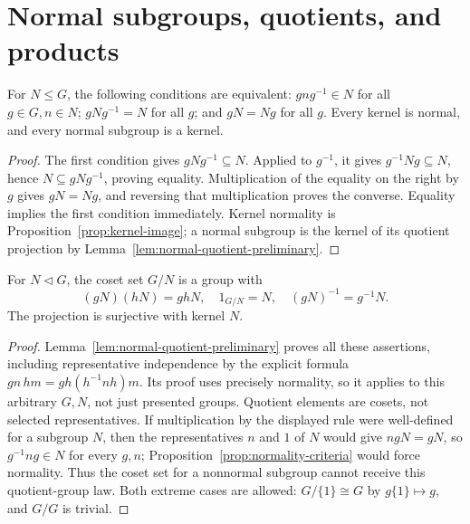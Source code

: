 \chapter{Normal subgroups, quotients, and products}\label{chap:M07.04}

\begin{proposition}\label{prop:normality-criteria}
For $N\leq G$, the following conditions are equivalent: $gng^{-1}\in N$ for all $g\in G,n\in N$; $gNg^{-1}=N$ for all $g$; and $gN=Ng$ for all $g$. Every kernel is normal, and every normal subgroup is a kernel.
\end{proposition}
\begin{proof}
The first condition gives $gNg^{-1}\subseteq N$. Applied to $g^{-1}$, it gives $g^{-1}Ng\subseteq N$, hence $N\subseteq gNg^{-1}$, proving equality. Multiplication of the equality on the right by $g$ gives $gN=Ng$, and reversing that multiplication proves the converse. Equality implies the first condition immediately. Kernel normality is Proposition~\ref{prop:kernel-image}; a normal subgroup is the kernel of its quotient projection by Lemma~\ref{lem:normal-quotient-preliminary}.
\end{proof}

\begin{theorem}\label{thm:quotient-group}
For $N\mathrel{\triangleleft}G$, the coset set $G/N$ is a group with
\[
 (gN)(hN)=ghN,\quad 1_{G/N}=N,\quad (gN)^{-1}=g^{-1}N.
\]
The projection is surjective with kernel $N$.
\end{theorem}
\begin{proof}
Lemma~\ref{lem:normal-quotient-preliminary} proves all these assertions, including representative independence by the explicit formula $gn\,hm=gh(h^{-1}nh)m$. Its proof uses precisely normality, so it applies to this arbitrary $G,N$, not just presented groups. Quotient elements are cosets, not selected representatives. If multiplication by the displayed rule were well-defined for a subgroup $N$, then the representatives $n$ and $1$ of $N$ would give $ngN=gN$, so $g^{-1}ng\in N$ for every $g,n$; Proposition~\ref{prop:normality-criteria} would force normality. Thus the coset set for a nonnormal subgroup cannot receive this quotient-group law. Both extreme cases are allowed: $G/\{1\}\cong G$ by $g\{1\}\mapsto g$, and $G/G$ is trivial.
\end{proof}

